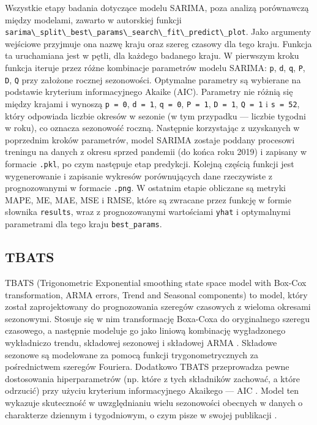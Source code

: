 \documentclass[polish, twoside, 12pt, a4paper]{article}
\theoremstyle{definition}
\theoremstyle{plain}
\theoremstyle{remark}
\newcommand{\code}[1]{\lstinline{#1}}
\begin{document}
Wszystkie etapy badania dotyczące modelu SARIMA, poza analizą porównawczą między modelami, zawarto w autorskiej funkcji \code{sarima\_split\_best\_params\_search\_fit\_predict\_plot}. Jako argumenty wejściowe przyjmuje ona nazwę kraju oraz szereg czasowy dla tego kraju. Funkcja ta uruchamiana jest w pętli, dla każdego badanego kraju. W pierwszym kroku funkcja iteruje przez różne kombinacje parametrów modelu SARIMA: \code{p}, \code{d}, \code{q}, \code{P}, \code{D}, \code{Q} przy założone rocznej sezonowości. Optymalne parametry są wybierane na podstawie kryterium informacyjnego Akaike (AIC). Parametry nie różnią się między krajami i wynoszą \code{p = 0}, \code{d = 1}, \code{q = 0}, \code{P = 1}, \code{D = 1}, \code{Q = 1} i \code{s = 52}, który odpowiada liczbie okresów w sezonie (w tym przypadku --- liczbie tygodni w roku), co oznacza sezonowość roczną. Następnie korzystając z uzyskanych w poprzednim kroków parametrów, model SARIMA zostaje poddany procesowi treningu na danych z okresu sprzed pandemii (do końca roku 2019) i zapisany w formacie \code{.pkl}, po czym następuje etap predykcji. Kolejną częścią funkcji jest wygenerowanie i zapisanie wykresów porównujących dane rzeczywiste z prognozowanymi w formacie \code{.png}. W ostatnim etapie obliczane są metryki MAPE, ME, MAE, MSE i RMSE, które są zwracane przez funkcję w formie słownika \code{results}, wraz z prognozowanymi wartościami \code{yhat} i optymalnymi parametrami dla tego kraju \code{best_params}.
	
\subsection{TBATS}

TBATS (Trigonometric Exponential smoothing state space model with Box-Cox transformation, ARMA errors, Trend and Seasonal components) to model, który został zaprojektowany do prognozowania szeregów czasowych z wieloma okresami sezonowymi. Stosuje się w nim transformację Boxa-Coxa do oryginalnego szeregu czasowego, a następnie modeluje go jako liniową kombinację wygładzonego wykładniczo trendu, składowej sezonowej i składowej ARMA \citep{delivera2010}. Składowe sezonowe są modelowane za pomocą funkcji trygonometrycznych za pośrednictwem szeregów Fouriera. Dodatkowo TBATS przeprowadza pewne dostosowania hiperparametrów (np. które z tych składników zachować, a które odrzucić) przy użyciu kryterium informacyjnego Akaikego --- AIC \citep{hyndman2014}. Model ten  wykazuje skuteczność w uwzględnianiu wielu sezonowości obecnych w danych o charakterze dziennym i tygodniowym, o czym pisze w swojej publikacji \cite{montero2020}.
\end{document}
